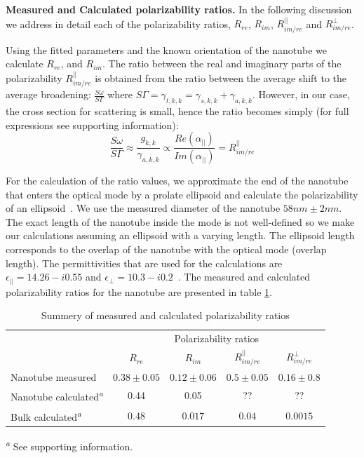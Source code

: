 \documentclass[journal=jacsat,manuscript=article]{achemso}
\begin{document}
\textbf{Measured and Calculated polarizability ratios.} In the following discussion we address in detail each of the polarizability ratios, $R_{re}$, $R_{im}$, $R_{im/re}^{||}$ and $R_{im/re}^{\perp}$.

Using the fitted parameters and the known orientation of the nanotube we calculate $R_{re}$, and $R_{im}$.
The ratio between the real and imaginary parts of the polarizability $R_{im/re}^{||}$
is obtained from the ratio between the average shift to the average broadening: $\frac{\textit{S} \omega} {\textit{S} \Gamma}$ where $\textit{S} \Gamma= \gamma_{t,k,k}=\gamma_{s,k,k}+\gamma_{a,k,k}$. However, in our case,  the cross section for scattering is small, hence the ratio becomes simply (for full expressions see supporting information):
\begin{equation}\label{eq:Rre_im_noscatt}
   \frac{\textit{S} \omega} {\textit{S} \Gamma} \approx \frac{g_{k,k}}{\gamma_{a,k,k}} \propto \frac{Re ( \alpha_{||} )}{Im (\alpha_{||})} = R_{im/re}^{||}
\end{equation}

For the calculation of the ratio values, we approximate the end of the nanotube that enters the optical mode by a prolate ellipsoid and calculate the polarizability of an ellipsoid~\cite{hulst1957light}. We use the measured diameter of the nanotube $58nm \pm 2nm$. The exact length of the nanotube inside the mode is not well-defined so we make our calculations assuming an ellipsoid with a varying length. The ellipsoid length corresponds to the overlap of the nanotube with the optical mode (overlap length).  The permittivities that are used for the calculations are $\epsilon_{||}=14.26-i0.55$ and $\epsilon_{\perp}=10.3-i0.2$~\cite{taverna2002}. The measured and calculated polarizability ratios for the nanotube are presented in table \ref{tbl:PR}.

\begin{table}[H]
  \caption{Summery of measured and calculated polarizability ratios}
  \label{tbl:PR}
  \begin{tabular}{lcccc}
    \hline
     & \multicolumn{4}{c}{Polarizability ratios}\\
                                & $R_{re}$ & $R_{im}$ & $R_{im/re}^{||}$ & $R_{im/re}^{\perp}$ \\
    \hline
    Nanotube measured  & $0.38 \pm 0.05$ &  $0.12 \pm 0.06$ & $0.5 \pm 0.05$ & $0.16 \pm 0.8$ \\
    Nanotube calculated\textsuperscript{\emph{a}}  & 0.44 &  0.05 & ?? & ?? \\
    Bulk calculated\textsuperscript{\emph{a}}  & $0.48$ &  $0.017$ & $0.04$ & $0.0015$ \\
    \hline
  \end{tabular}
  
  \textsuperscript{\emph{a}} See supporting information.
\end{table}
\end{document}
